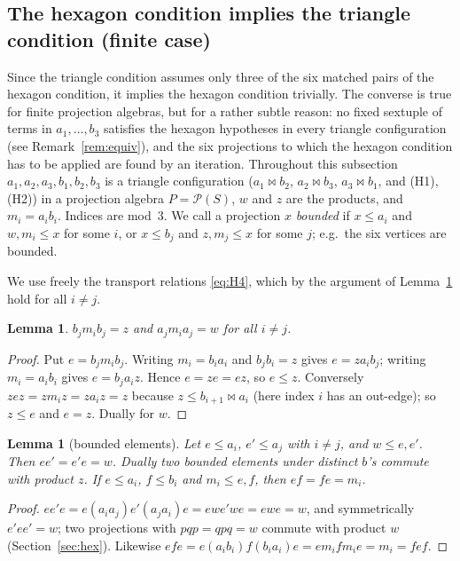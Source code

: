 \documentclass[11pt]{amsart}
\newtheorem{lemma}[theorem]{Lemma}
\theoremstyle{definition}
\renewcommand{\P}{\mathcal{P}}
\newcommand{\mt}{\bowtie}   %
\begin{document}
\subsection{The hexagon condition implies the triangle condition (finite case)}\label{subsec:equiv}

Since the triangle condition assumes only three of the six matched pairs of the hexagon condition, it implies the hexagon condition trivially. The converse is true for finite projection algebras, but for a rather subtle reason: no fixed sextuple of terms in $a_1,\dots,b_3$ satisfies the hexagon hypotheses in every triangle configuration (see Remark~\ref{rem:equiv}), and the six projections to which the hexagon condition has to be applied are found by an iteration. Throughout this subsection $a_1,a_2,a_3,b_1,b_2,b_3$ is a triangle configuration ($a_1\mt b_2$, $a_2\mt b_3$, $a_3\mt b_1$, and (H1), (H2)) in a projection algebra $P=\P(S)$, $w$ and $z$ are the products, and $m_i=a_ib_i$. Indices are mod~$3$. We call a projection $x$ \emph{bounded} if $x\le a_i$ and $w,m_i\le x$ for some $i$, or $x\le b_j$ and $z,m_j\le x$ for some $j$; e.g.\ the six vertices are bounded.

We use freely the transport relations \eqref{eq:H4}, which by the argument of Lemma~\ref{lem:rev} hold for all $i\ne j$.

\begin{lemma}\label{lem:rev}
$b_jm_ib_j=z$ and $a_jm_ia_j=w$ for all $i\ne j$.
\end{lemma}
\begin{proof}
Put $e=b_jm_ib_j$. Writing $m_i=b_ia_i$ and $b_jb_i=z$ gives $e=za_ib_j$; writing $m_i=a_ib_i$ gives $e=b_ja_iz$. Hence $e=ze=ez$, so $e\le z$. Conversely $zez=zm_iz=za_iz=z$ because $z\le b_{i+1}\mt a_i$ (here index $i$ has an out-edge); so $z\le e$ and $e=z$. Dually for $w$.
\end{proof}

\begin{lemma}[bounded elements]\label{lem:bounded}
Let $e\le a_i$, $e'\le a_j$ with $i\ne j$, and $w\le e,e'$. Then $ee'=e'e=w$. Dually two bounded elements under distinct $b$'s commute with product $z$. If $e\le a_i$, $f\le b_i$ and $m_i\le e,f$, then $ef=fe=m_i$.
\end{lemma}
\begin{proof}
$ee'e=e(a_ia_j)e'(a_ja_i)e=ewe'we=ewe=w$, and symmetrically $e'ee'=w$; two projections with $pqp=qpq=w$ commute with product $w$ (Section~\ref{sec:hex}). Likewise $efe=e(a_ib_i)f(b_ia_i)e=em_ifm_ie=m_i=fef$.
\end{proof}
\end{document}
